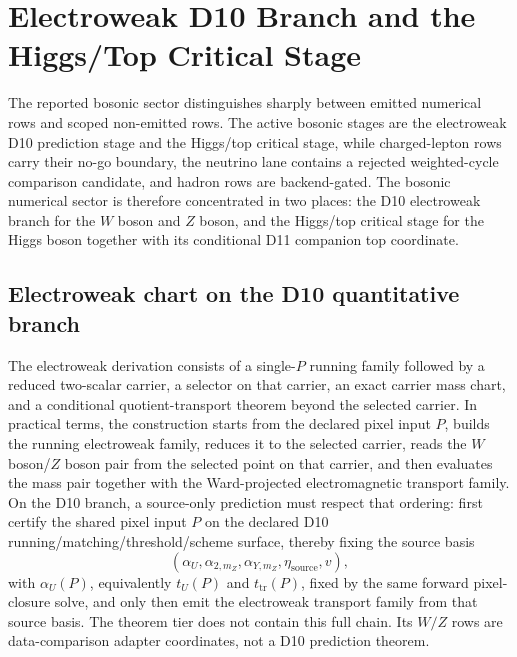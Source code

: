 \documentclass[11pt]{article}
\begin{document}
\section{Electroweak D10 Branch and the Higgs/Top Critical Stage}

The reported bosonic sector distinguishes sharply between emitted numerical rows and scoped
non-emitted rows. The active bosonic stages are the electroweak
D10 prediction stage and the Higgs/top critical stage, while charged-lepton rows
carry their no-go boundary, the neutrino lane contains a rejected weighted-cycle comparison candidate, and hadron rows are backend-gated. The bosonic numerical
sector is therefore concentrated in two places: the D10 electroweak branch for the \(W\) boson and \(Z\) boson, and
the Higgs/top critical stage for the Higgs boson together with its conditional D11 companion top coordinate.

\subsection{Electroweak chart on the D10 quantitative branch}

The electroweak derivation consists of a single-\(P\) running family followed by a
reduced two-scalar carrier, a selector on that carrier, an exact carrier mass
chart, and a conditional quotient-transport theorem beyond the selected
carrier. In practical terms, the construction starts from
the declared pixel input \(P\), builds the running electroweak family, reduces it to the selected
carrier, reads the \(W\) boson/\(Z\) boson pair from the selected point on that carrier,
and then evaluates the mass pair together with the Ward-projected electromagnetic transport family.
On the D10 branch, a source-only prediction must respect that ordering: first certify
the shared pixel input \(P\) on the declared D10 running/matching/threshold/scheme surface, thereby fixing the source basis
\[
(\alpha_U,\alpha_{2,m_Z},\alpha_{Y,m_Z},\eta_{\mathrm{source}},v),
\]
with \(\alpha_U(P)\), equivalently \(t_U(P)\) and \(t_{\mathrm{tr}}(P)\), fixed by the
same forward pixel-closure solve,
and only then emit the electroweak transport family from that source basis. The theorem tier does
not contain this full chain. Its \(W/Z\) rows are data-comparison adapter coordinates,
not a D10 prediction theorem.
\end{document}
